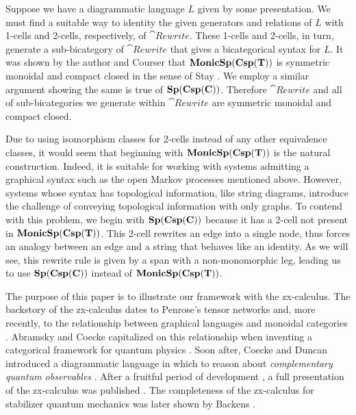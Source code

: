 Suppose we have a 
diagrammatic language $L$
given by some presentation.  
We must find
a suitable way to identity  
the given generators and relations of $L$
with 1-cells and 2-cells, 
respectively, of $\cat{Rewrite}$.
These 1-cells and 2-cells, in turn, 
generate a sub-bicategory of $\cat{Rewrite}$ 
that gives a bicategorical syntax 
for $L$.  
It was shown by the author and Courser
	\cite{CicalaCourser_BicatSpansCospan} 
that $\mathbf{MonicSp(Csp(T))}$ is 
symmetric monoidal and compact closed
in the sense of Stay 
	\cite{Stay_CompactClosedBicats}.
We employ a similar argument
showing the same is true of $\mathbf{Sp(Csp(C))}$.
Therefore $\cat{Rewrite}$ and 
all of sub-bicategories
we generate within $\cat{Rewrite}$ 
are symmetric monoidal and compact closed.

Due to using isomorphism classes for 2-cells
instead of any other equivalence classes,
it would seem that beginning with 
$\mathbf{MonicSp(Csp(T))}$ is the natural construction. 
Indeed, it is suitable for working with systems 
admitting a graphical syntax such as
the open Markov processes mentioned above. 
However, systems whose 
syntax has topological information, 
like string diagrams, 
introduce the challenge of 
conveying topological information 
with only graphs. 
To contend with this problem, 
we begin with $\mathbf{Sp(Csp(C))}$ 
because it has a 2-cell 
not present in $\mathbf{MonicSp(Csp(T))}$.
This 2-cell rewrites an edge into a single node,
thus forces an analogy between an edge
and a string that behaves like an identity.
As we will see, this rewrite rule is given by 
a span with a non-monomorphic leg, 
leading us to use
$\mathbf{Sp(Csp(C))}$ instead of $\mathbf{MonicSp(Csp(T))}$. 

The purpose of this paper is 
to illustrate our framework with
the zx-calculus.  
The backstory of the zx-calculus dates to 
Penrose's tensor networks
	\cite{Penrose_NegDimTensors} 
and, more recently, 
to the relationship between 
graphical languages and 
monoidal categories 
	\cite{JoyalStreet_GeomTensorCalc,Selinger_GraphicsMonCats}.  
Abramsky and Coecke 
capitalized on this relationship 
when inventing a categorical framework 
for quantum physics
	\cite{AbramCoecke_CatSemanticQuantum}.  
Soon after, 
Coecke and Duncan 
introduced a diagrammatic language 
in which to reason about 
\emph{complementary quantum observables} 
	\cite{CoeckeDuncan_QuantumObsInitialReport}. 
After a fruitful period of development
\cite{CoeckeEdwardsSpekkens_PhaseGrpsNonLocality,
CoeckePerdix_EnvironClassicChannels,
DuncanPerdix_GraphStatesEulerDecomp,
DuncanPerdrix_RewritingQuantumCompu,
EvansDuncanLangPanan_ClassMutualUnbias,
Pavlovic_QuanClassNondetermCompu}, 
a full presentation of 
the zx-calculus was published
	\cite{CoeckeDuncan_QuantumObsFullPaper}.
The completeness of 
the zx-calculus for 
stabilizer quantum mechanics 
was later shown by Backens 
	\cite{Backens_Completeness}.  

